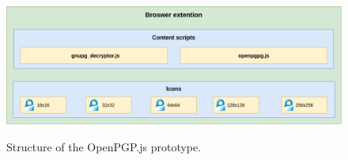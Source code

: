 \begin{figure}[H]
    \begin{center}
        \label{img:openpgpAnatomy}
        \includegraphics[width=1.0\textwidth]{obrazky-figures/prototype-openpgpjs.png}
        \caption{Structure of the OpenPGP.js prototype.}
    \end{center}
\end{figure}

